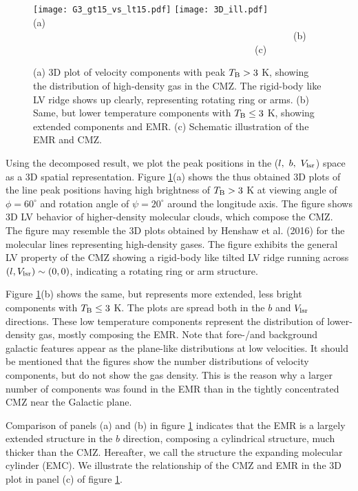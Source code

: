 \documentclass[useAMS,usenatbib]{mn2e}
\def\vlsr{V_{\rm lsr}}
\def\deg{^\circ}\def\Deg{^\circ}
\def\Tb{T_{\rm B}} \def\Tp{T_{\rm peak}}
\begin{document}
\begin{figure*} 
\begin{center} 
\texttt{[image: G3\_gt15\_vs\_lt15.pdf]}
\texttt{[image: 3D\_ill.pdf]} 
\\
(a) ~~~~~~~~~~~~~~~~~~~~~~~~~~~~~~~~~~~~~~~~~~~~~~~~~~~~~~(b)~~~~~~~~~~~~~~~~~~~~~~~~~~~~~~~~~~~~~~~~~~~~~~~~~(c)\\
\end{center}
\caption{(a) 3D plot of velocity components with peak $\Tb >3$ K, showing the distribution of high-density gas in the CMZ. The rigid-body like LV ridge shows up clearly, representing rotating ring or arms. (b) Same, but lower temperature components with $\Tb \le 3$ K, showing extended components and EMR. (c) Schematic illustration of the EMR and CMZ. }
 \label{3Db}  
\end{figure*}   

Using the decomposed result, we plot the peak positions in the ($l,\ b,\ \vlsr$) space as a 3D spatial representation. Figure \ref{3Db}(a) shows the thus obtained 3D plots of the line peak positions having high brightness of $\Tb > 3$ K at viewing angle of $\phi=60\deg$ and rotation angle of $\psi=20\deg$ around the longitude axis. The figure shows 3D LV behavior of higher-density molecular clouds, which compose the CMZ. The figure may resemble the 3D plots obtained by Henshaw et al. (2016) for the molecular lines representing high-density gases.
The figure exhibits the general LV property of the CMZ showing a rigid-body like tilted LV ridge running across $(l,\vlsr)\sim(0,0)$, indicating a rotating ring or arm structure. 

Figure \ref{3Db}(b) shows the same, but represents more extended, less bright components with $\Tb \le 3$ K. The plots are spread both in the $b$ and $\vlsr$ directions. These low temperature components represent the distribution of lower-density gas, mostly composing the EMR. Note that fore-/and background galactic features appear as the plane-like distributions at low velocities. 
It should be mentioned that the figures show the number distributions of velocity components, but do not show the gas density. This is the reason why a larger number of components was found in the EMR than in the tightly concentrated CMZ near the Galactic plane. 

Comparison of panels (a) and (b) in figure \ref{3Db} indicates that the EMR is a largely extended structure in the $b$ direction, composing a cylindrical structure, much thicker than the CMZ. Hereafter, we call the structure the expanding molecular cylinder (EMC). We illustrate the relationship of the CMZ and EMR in the 3D plot in panel (c) of figure \ref{3Db}. 
\end{document}
